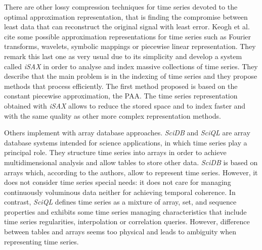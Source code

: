 There are other lossy compression techniques for time series devoted
to the optimal approximation representation, that is finding the
compromise between least data that can reconstruct the original signal
with least error. Keogh et al.\ \cite{keogh01} cite some possible
approximation representations for time series such as Fourier
transforms, wavelets, symbolic mappings or piecewise linear
representation. They remark this last one as very usual due to its
simplicity and develop a system called \emph{iSAX}
\cite{keogh08:isax,keogh10:isax} in order to analyse and index massive
collections of time series. They describe that the main problem is in
the indexing of time series and they propose methods that process
efficiently. The first method proposed is based on the constant
piecewise approximation, the PAA. The time
series representation obtained with \emph{iSAX} allows to reduce the
stored space and to index faster and with the same quality as other
more complex representation methods.


 



 

 
Others implement  with array database approaches.
\emph{SciDB} \cite{stonebraker09:scidb} and \emph{SciQL}
\cite{zhang11} are array database systems intended for science
applications, in which time series play a principal role. They
structure time series into arrays in order to achieve multidimensional
analysis and allow tables to store other data.  \emph{SciDB} is based
on arrays which, according to the authors, allow to represent time
series. However, it does not consider time series special needs: it
does not care for managing continuously voluminous data neither for
achieving temporal coherence.  In contrast, \emph{SciQL} defines time
series as a mixture of array, set, and sequence properties and
exhibits some time series managing characteristics that include time
series regularities, interpolation or correlation queries.  However,
difference between tables and arrays seems too physical and leads to
ambiguity when representing time series.




